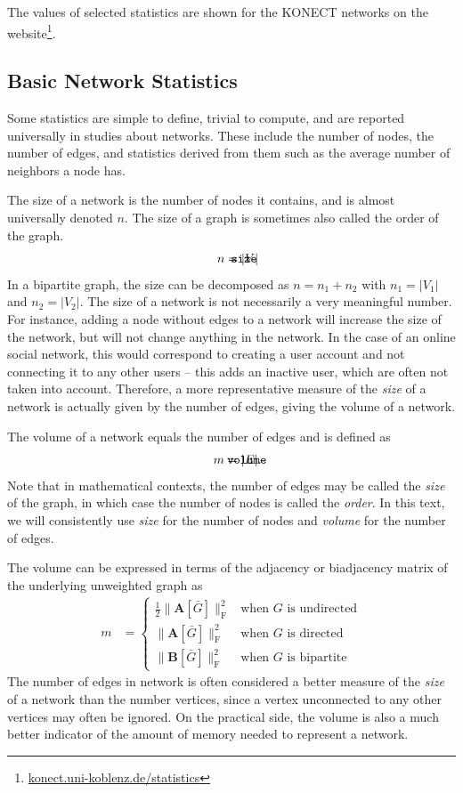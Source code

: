 \documentclass{article}
\def\mathnote#1{%
  \tag*{\rlap{\hspace\marginparsep\smash{\parbox[t]{\marginparwidth}{#1}}}}
}
\begin{document}
The values of selected statistics are
shown for the KONECT networks on the
website\footnote{\href{http://konect.uni-koblenz.de/statistics/}{konect.uni-koblenz.de/statistics}}.  

\subsection{Basic Network Statistics}
Some statistics are simple to define, trivial to compute, and 
are reported universally in studies about networks.  These include the
number of nodes, the number of edges, and statistics derived from them
such as the average number of neighbors a node has.  

The size of a network is the number of nodes it contains, and
is almost universally denoted $n$.  The size of a graph is sometimes also
called the order of the graph. 
\begin{align}
  \mathnote{\texttt{size}}
  n &= |V|
\end{align}
In a bipartite graph, the size can be decomposed as $n = n_1 + n_2$ with
$n_1 = |V_1|$ and $n_2=|V_2|$.  The size of a network is not necessarily
a very meaningful number.  For instance, adding a node without edges to
a network will increase the size of the network, but will not change
anything in the network. In the case of an online social
network, this would correspond to creating a user account and not
connecting it to any other users -- this adds an inactive user, which
are often not taken into account.  Therefore, a more representative
measure of the \emph{size} of a network is actually given by the number
of edges, giving the volume of a network.

The volume of a network equals the number of edges and is defined as 
\begin{align}
  \mathnote{\texttt{volume}}
  m &= |E|. 
\end{align}
Note that in mathematical contexts, the number of edges may be called
the \emph{size} of the graph, in which case the number of nodes is
called the \emph{order}.  In this text, we will consistently use
\emph{size} for the number of nodes and \emph{volume} for the number of
edges. 

The volume can be expressed in terms of
the adjacency or biadjacency matrix of the underlying unweighted graph as
\begin{align}
  m &= \left\{ \begin{array}{ll}
    \frac 1 2 \| \mathbf A[\bar G] \|_{\mathrm F} ^2 &
    \text{when $G$ is undirected} \\
    \| \mathbf A[\bar G] \| _{\mathrm F} ^2 &
    \text{when $G$ is directed} \\
    \| \mathbf B[\bar G] \| _{\mathrm F} ^2 &    
    \text{when $G$ is bipartite}
    \end{array} \right.
\end{align}
The number of edges in network is often considered a better measure of
the \emph{size} of a network than the number vertices, since a vertex
unconnected to any other vertices may often be ignored.  On the
practical side, the volume is also a much better indicator of the amount
of memory needed to represent a network.
\end{document}
